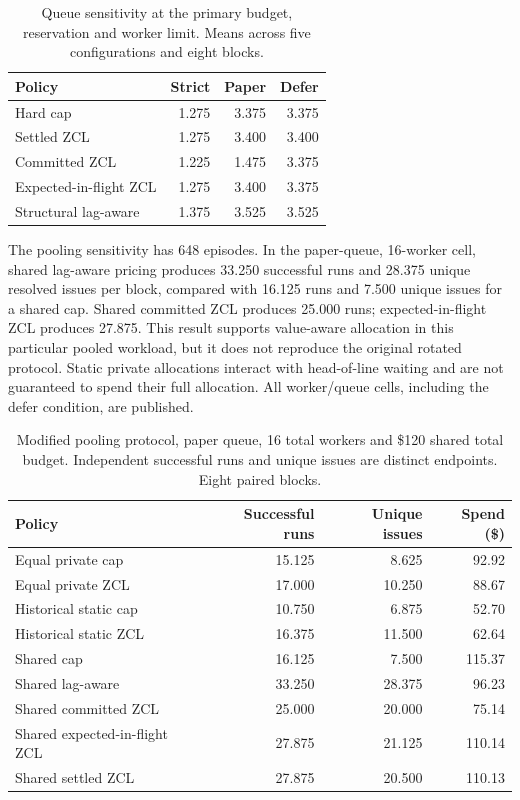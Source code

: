 \documentclass[11pt]{article}
\begin{document}
\begin{table}[tbp]\centering\small
\caption{Queue sensitivity at the primary budget, reservation and worker limit. Means across five configurations and eight blocks.}\label{tab:queues}
\begin{tabular}{lrrr}
\toprule
Policy & Strict & Paper & Defer \\ \midrule
Hard cap & 1.275 & 3.375 & 3.375 \\
Settled ZCL & 1.275 & 3.400 & 3.400 \\
Committed ZCL & 1.225 & 1.475 & 3.375 \\
Expected-in-flight ZCL & 1.275 & 3.400 & 3.375 \\
Structural lag-aware & 1.375 & 3.525 & 3.525 \\
\bottomrule\end{tabular}\end{table}
The pooling sensitivity has 648 episodes. In the paper-queue, 16-worker cell, shared lag-aware pricing produces 33.250 successful runs and 28.375 unique resolved issues per block, compared with 16.125 runs and 7.500 unique issues for a shared cap. Shared committed ZCL produces 25.000 runs; expected-in-flight ZCL produces 27.875. This result supports value-aware allocation in this particular pooled workload, but it does not reproduce the original rotated protocol. Static private allocations interact with head-of-line waiting and are not guaranteed to spend their full allocation. All worker/queue cells, including the defer condition, are published.
\begin{table}[tbp]\centering\small
\caption{Modified pooling protocol, paper queue, 16 total workers and \$120 shared total budget. Independent successful runs and unique issues are distinct endpoints. Eight paired blocks.}\label{tab:pool}
\begin{tabular}{lrrr}
\toprule
Policy & Successful runs & Unique issues & Spend (\$) \\ \midrule
Equal private cap & 15.125 & 8.625 & 92.92 \\
Equal private ZCL & 17.000 & 10.250 & 88.67 \\
Historical static cap & 10.750 & 6.875 & 52.70 \\
Historical static ZCL & 16.375 & 11.500 & 62.64 \\
Shared cap & 16.125 & 7.500 & 115.37 \\
Shared lag-aware & 33.250 & 28.375 & 96.23 \\
Shared committed ZCL & 25.000 & 20.000 & 75.14 \\
Shared expected-in-flight ZCL & 27.875 & 21.125 & 110.14 \\
Shared settled ZCL & 27.875 & 20.500 & 110.13 \\
\bottomrule\end{tabular}\end{table}
\end{document}
